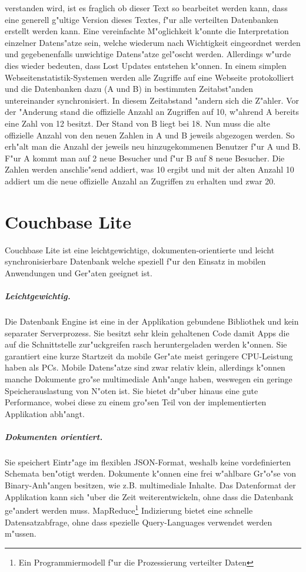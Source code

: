 \documentclass[a4paper,14pt]{scrreprt}
\begin{document}
verstanden wird, ist es fraglich ob dieser Text so bearbeitet werden kann, dass eine generell g"ultige Version dieses Textes, f"ur alle verteilten Datenbanken erstellt werden kann. Eine vereinfachte M"oglichkeit k"onnte die Interpretation einzelner Datens"atze sein, welche wiederum nach Wichtigkeit eingeordnet werden und gegebenenfalls unwichtige Datens"atze gel"oscht werden. Allerdings w"urde dies wieder bedeuten, dass Lost Updates entstehen k"onnen. In einem simplen Webseitenstatistik-Systemen werden alle Zugriffe auf eine Webseite protokolliert und die Datenbanken dazu (A und B) in bestimmten Zeitabst"anden untereinander synchronisiert. In diesem Zeitabstand "andern sich die Z"ahler. Vor der "Anderung stand die offizielle Anzahl an Zugriffen auf 10, w"ahrend A bereits eine Zahl von 12 besitzt. Der Stand von B liegt bei 18. Nun muss die alte offizielle Anzahl von den neuen Zahlen in A und B jeweils abgezogen werden. So erh"alt man die Anzahl der jeweils neu hinzugekommenen Benutzer f"ur A und B. F"ur A kommt man auf 2 neue Besucher und f"ur B auf 8 neue Besucher. Die Zahlen werden anschlie"send addiert, was 10 ergibt und mit der alten Anzahl 10 addiert um die neue offizielle Anzahl an Zugriffen zu erhalten und zwar 20.\cite{ausWo}
 
\chapter{Couchbase Lite}
Couchbase Lite ist eine leichtgewichtige, dokumenten-orientierte und leicht synchronisierbare Datenbank welche speziell f"ur den Einsatz in mobilen Anwendungen und Ger"aten geeignet ist.
\paragraph{Leichtgewichtig.}
Die Datenbank Engine ist eine in der Applikation gebundene Bibliothek und kein separater Serverprozess. Sie besitzt sehr klein gehaltenen Code damit Apps die auf die Schnittstelle zur"uckgreifen rasch heruntergeladen werden k"onnen. Sie garantiert eine kurze Startzeit da mobile Ger"ate meist geringere CPU-Leistung haben als PCs. Mobile Datens"atze sind zwar relativ klein, allerdings k"onnen manche Dokumente gro"se multimediale Anh"ange haben, weswegen ein geringe Speicherauslastung von N"oten ist. Sie bietet dr"uber hinaus eine gute Performance, wobei diese zu einem gro"sen Teil von der implementierten Applikation abh"angt.

\paragraph{Dokumenten orientiert.}
Sie speichert Eintr"age im flexiblen JSON-Format, weshalb keine vordefinierten Schemata ben"otigt werden. Dokumente k"onnen eine frei w"ahlbare Gr"o"se von Binary-Anh"angen besitzen, wie z.B. multimediale Inhalte. Das Datenformat der Applikation kann sich "uber die Zeit weiterentwickeln, ohne dass die Datenbank ge"andert werden muss. MapReduce\footnote[1]{Ein Programmiermodell f"ur die Prozessierung verteilter Daten} Indizierung bietet eine schnelle Datensatzabfrage, ohne dass spezielle Query-Languages verwendet werden m"ussen.
\end{document}
